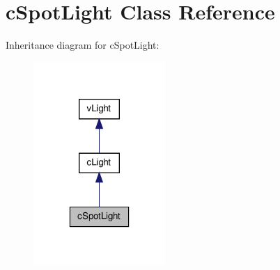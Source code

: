 \hypertarget{classc_spot_light}{
\section{cSpotLight Class Reference}
\label{classc_spot_light}
}


Inheritance diagram for cSpotLight:
\nopagebreak
\begin{figure}[H]
\begin{center}
\leavevmode
\includegraphics[width=142pt]{classc_spot_light__inherit__graph}
\end{center}
\end{figure}


